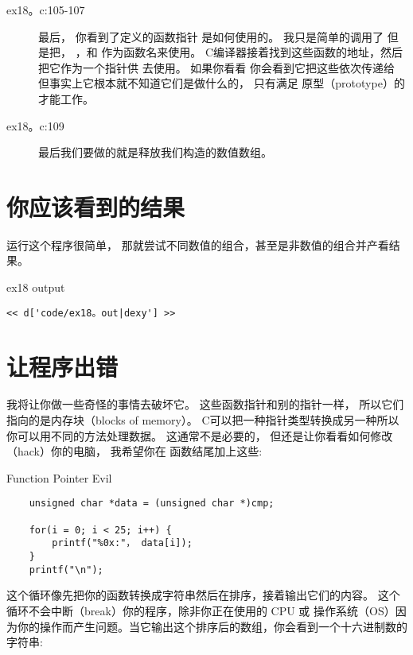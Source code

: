 \begin{description}
\item[ex18。c:105-107] 最后， 你看到了定义的函数指针 是如何使用的。 我只是简单的调用了  但是把， ，和
    作为函数名来使用。 C编译器接着找到这些函数的地址，然后把它作为一个指针供  去使用。 如果你看看 你会看到它把这些依次传递给 但事实上它根本就不知道它们是做什么的， 只有满足 原型（prototype）的才能工作。
\item[ex18。c:109] 最后我们要做的就是释放我们构造的数值数组。
\end{description}


\section{你应该看到的结果}

运行这个程序很简单， 那就尝试不同数值的组合，甚至是非数值的组合并产看结果。

\begin{code}{ex18 output}
\begin{lstlisting}
<< d['code/ex18。out|dexy'] >>
\end{lstlisting}
\end{code}


\section{让程序出错}

我将让你做一些奇怪的事情去破坏它。  这些函数指针和别的指针一样， 所以它们指向的是内存块（blocks of memory）。  C可以把一种指针类型转换成另一种所以你可以用不同的方法处理数据。  这通常不是必要的， 但还是让你看看如何修改（hack）你的电脑， 我希望你在  函数结尾加上这些:

\begin{code}{Function Pointer Evil}
\begin{lstlisting}
    unsigned char *data = (unsigned char *)cmp;

    for(i = 0; i < 25; i++) {
        printf("%0x:"， data[i]);
    }
    printf("\n");
\end{lstlisting}
\end{code}

这个循环像先把你的函数转换成字符串然后在排序，接着输出它们的内容。 这个循环不会中断（break）你的程序，除非你正在使用的 CPU 或 操作系统（OS）因为你的操作而产生问题。当它输出这个排序后的数组，你会看到一个十六进制数的字符串:

